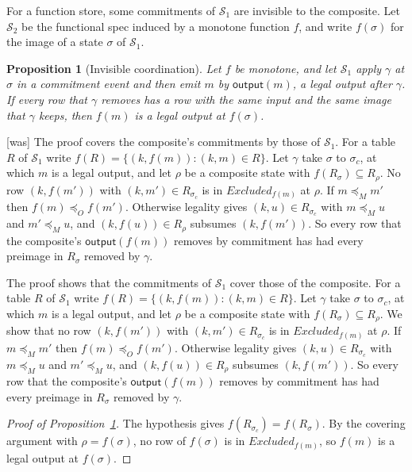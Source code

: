 \documentclass[sigconf]{cidr-2027}
\newtheorem{proposition}{Proposition}
\theoremstyle{remark}
\newcommand{\OutputOrd}{\preceq_O}
\newcommand{\commitment}{commitment\xspace}
\newcommand{\commitments}{commitments\xspace}
\newcommand{\Spec}{\mathcal{S}}
\newcommand{\Excluded}{\mathit{Excluded}}
\begin{document}
For a function store, some \commitments of $\Spec_1$ are invisible to the
composite.  Let $\Spec_2$ be the functional spec induced by a
monotone function $f$, and write
$f(\sigma)$ for the image of a state $\sigma$ of $\Spec_1$.

\begin{proposition}[Invisible coordination]
\label{prop:invisible-coordination}
Let $f$ be monotone, and let $\Spec_1$ apply $\gamma$ at $\sigma$ in a
\commitment event and then emit $m$ by $\mathsf{output}(m)$, a legal output
after $\gamma$.  If every row that $\gamma$ removes has a row with the same
input and the same image that $\gamma$ keeps, then $f(m)$ is a legal output at
$f(\sigma)$.
\end{proposition}



{\footnotesize\color{black!50}\noindent\textsf{[was]} The proof covers the composite's \commitments by those of $\Spec_1$.  For a
table $R$ of $\Spec_1$ write $f(R)=\{(k,f(m)):(k,m)\in R\}$.  Let
$\gamma$ take $\sigma$ to $\sigma_c$, at which $m$ is a legal output, and let
$\rho$ be a composite state with $f(R_\sigma)\subseteq R_\rho$.  No row
$(k,f(m'))$ with $(k,m')\in R_{\sigma_c}$ is in $\Excluded_{f(m)}$ at
$\rho$.  If $m\preceq_M m'$ then $f(m)\OutputOrd f(m')$.
Otherwise legality gives $(k,u)\in R_{\sigma_c}$ with $m\preceq_M u$ and
$m'\preceq_M u$, and $(k,f(u))\in R_\rho$ subsumes $(k,f(m'))$.  So every row
that the composite's $\mathsf{output}(f(m))$ removes by \commitment has had
every preimage in $R_\sigma$ removed by $\gamma$.\par}

\color{blue!70!black}The proof shows that the \commitments of $\Spec_1$ cover those of the
composite.  For a table $R$ of $\Spec_1$ write $f(R)=\{(k,f(m)):(k,m)\in R\}$.  Let
$\gamma$ take $\sigma$ to $\sigma_c$, at which $m$ is a legal output, and let
$\rho$ be a composite state with $f(R_\sigma)\subseteq R_\rho$.  We show that no row
$(k,f(m'))$ with $(k,m')\in R_{\sigma_c}$ is in $\Excluded_{f(m)}$ at
$\rho$.  If $m\preceq_M m'$ then $f(m)\OutputOrd f(m')$.
Otherwise legality gives $(k,u)\in R_{\sigma_c}$ with $m\preceq_M u$ and
$m'\preceq_M u$, and $(k,f(u))\in R_\rho$ subsumes $(k,f(m'))$.  So every row
that the composite's $\mathsf{output}(f(m))$ removes by \commitment has had
every preimage in $R_\sigma$ removed by $\gamma$.\color{black}

\begin{proof}[Proof of Proposition~\ref{prop:invisible-coordination}]
The hypothesis gives $f(R_{\sigma_c})=f(R_\sigma)$.  By the covering
argument with $\rho=f(\sigma)$, no row of $f(\sigma)$ is in
$\Excluded_{f(m)}$, so $f(m)$ is a legal output at $f(\sigma)$.
\end{proof}
\end{document}
